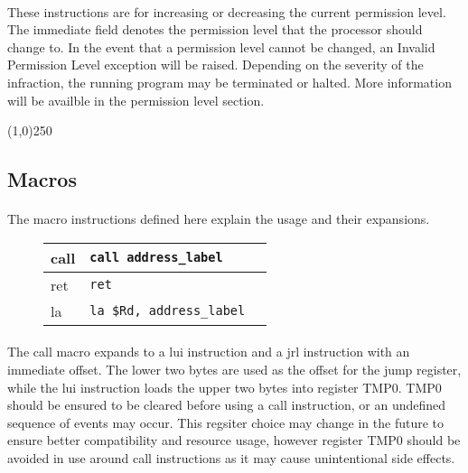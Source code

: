 \documentclass[letterpaper, 11pt]{article}
\begin{document}
\paragraph{} These instructions are for increasing or decreasing the current permission level. The immediate field
denotes the permission level that the processor should change to. In the event that a permission level cannot be changed,
an Invalid Permission Level exception will be raised. Depending on the severity of the infraction, the running program
may be terminated or halted. More information will be availble in the permission level section.

\begin{center}
	\line(1,0){250}
\end{center}


\subsection{Macros}
\paragraph{} The macro instructions defined here explain the usage and their expansions.

\begin{figure}[!h]
	\begin{center}
		\begin{tabular}{|l|l|l|}
			\hline
			call	& \texttt{call	address\_label}	\\ \hline
			ret		& \texttt{ret	}	\\ \hline
			la		& \texttt{la \$Rd, address\_label} \\ \hline
		 		\end{tabular} 
	\end{center}
	
\end{figure}
\paragraph{} The call macro expands to a lui instruction and a jrl instruction with an immediate offset. The lower two bytes
are used as the offset for the jump register, while the lui instruction loads the upper two bytes into register TMP0. 
TMP0 should be ensured to be cleared before using a call instruction, or an undefined sequence of events may occur.
This regsiter choice may change in the future to ensure better compatibility and resource usage, however register TMP0 should
be avoided in use around call instructions as it may cause unintentional side effects. 
\end{document}
